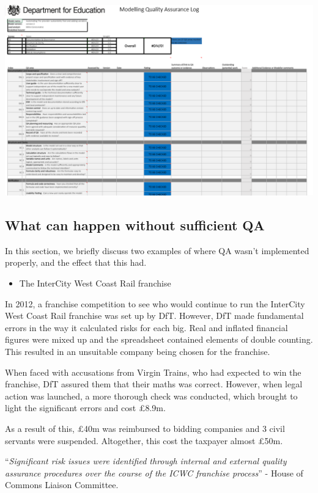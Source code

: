 \documentclass[
]{article}
\providecommand{\tightlist}{%
  \setlength{\itemsep}{0pt}\setlength{\parskip}{0pt}}
\begin{document}
\includegraphics{pictures/qa-log.png}

\hypertarget{what-can-happen-without-sufficient-qa}{%
\subsection{What can happen without sufficient QA}\label{what-can-happen-without-sufficient-qa}}

In this section, we briefly discuss two examples of where QA wasn't implemented properly, and the effect that this had.

\begin{itemize}
\tightlist
\item
  The InterCity West Coast Rail franchise
\end{itemize}

In 2012, a franchise competition to see who would continue to run the InterCity West Coast Rail franchise was set up by DfT. However, DfT made fundamental errors in the way it calculated risks for each big. Real and inflated financial figures were mixed up and the spreadsheet contained elements of double counting. This resulted in an unsuitable company being chosen for the franchise.

When faced with accusations from Virgin Trains, who had expected to win the franchise, DfT assured them that their maths was correct. However, when legal action was launched, a more thorough check was conducted, which brought to light the significant errors and cost £8.9m.

As a result of this, £40m was reimbursed to bidding companies and 3 civil servants were suspended. Altogether, this cost the taxpayer almost £50m.

``\emph{Significant risk issues were identified through internal and external quality assurance procedures over the course of the ICWC franchise process}'' - House of Commons Liaison Committee.
\end{document}
